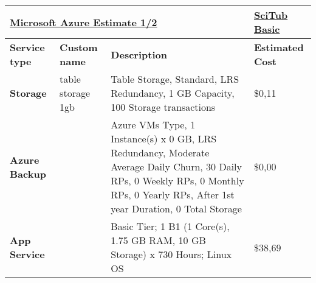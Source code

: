 %

\begin{landscape}
        \begin{table}[]
                \begin{tabularx}{\linewidth}{|l|X|X|X|}        %
                \hline
                \multicolumn{3}{|l|}{{\ul \textbf{Microsoft Azure Estimate 1/2}}}                     & {\ul \textbf{SciTub Basic}}                         \\ \hline
                \textbf{Service type}             & \textbf{Custom name}      & \textbf{Description}                                                                                                                                                                                                                             & \textbf{Estimated Cost}                  \\ \hline\hline
                \textbf{Storage}                  & table storage 1gb         & Table Storage, Standard, LRS Redundancy, 1 GB Capacity, 100 Storage transactions                                                                                                                                                                 & \$0,11                                   \\ \hline
                \textbf{Azure Backup}             &                           & Azure VMs Type, 1 Instance(s) x 0 GB, LRS Redundancy, Moderate Average Daily Churn, 30 Daily RPs, 0 Weekly RPs, 0 Monthly RPs, 0 Yearly RPs,  After 1st year Duration, 0 Total Storage                                                           & \$0,00                                   \\ \hline
                \textbf{App Service}              &                           & Basic Tier; 1 B1 (1 Core(s), 1.75 GB RAM, 10 GB Storage) x 730 Hours; Linux OS                                                                                                                                                                   & \$38,69                                  \\ \hline

\end{tabularx}
\end{table}
\end{landscape}
